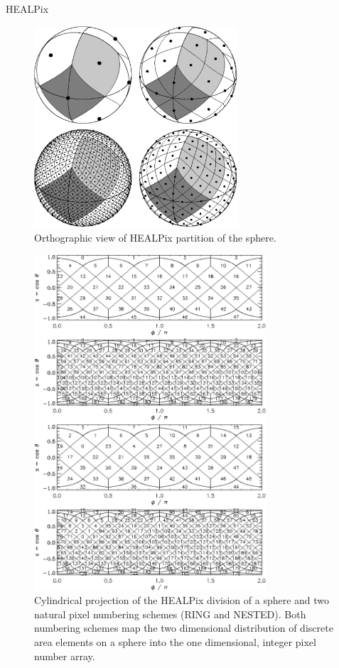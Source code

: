 HEALPix \cite{healpix}

\begin{figure}[!ht]
\centerline{\includegraphics[height=7.5cm]{images/healpix4.pdf}}
\caption[Orthographic view of Healpix partition of the sphere]%
{\label{fig:HEALPIX}%
Orthographic view of HEALPix partition of the sphere.}
\end{figure}

\begin{figure} [!ht]
\centerline{\includegraphics[height=12.5cm]{images/healpix2d.pdf}}
\caption[Cylindrical projection]%
{\label{fig:Numbering}%
Cylindrical projection of the HEALPix division of a
sphere and two natural pixel numbering schemes (RING and NESTED). 
Both numbering schemes map the two dimensional 
distribution
of discrete area elements on a sphere into the one dimensional, 
integer pixel number array.
}
\end{figure}